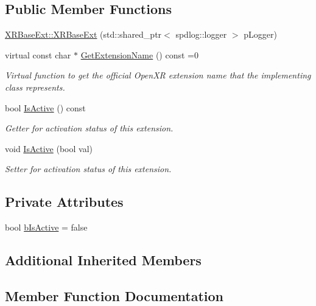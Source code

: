 \subsection*{Public Member Functions}
\begin{DoxyCompactItemize}
\item 
\mbox{\hyperlink{class_open_x_r_provider_1_1_x_r_base_ext_a8f59e68df5f1773152a3dfbe9ddc17fc}{X\+R\+Base\+Ext\+::\+X\+R\+Base\+Ext}} (std\+::shared\+\_\+ptr$<$ spdlog\+::logger $>$ p\+Logger)
\item 
virtual const char $\ast$ \mbox{\hyperlink{class_open_x_r_provider_1_1_x_r_base_ext_af23385b0dc226b0c4533a796ddc37352}{Get\+Extension\+Name}} () const =0
\begin{DoxyCompactList}\small\item\em Virtual function to get the official Open\+XR extension name that the implementing class represents. \end{DoxyCompactList}\item 
bool \mbox{\hyperlink{class_open_x_r_provider_1_1_x_r_base_ext_a40bce34f078349e639139ea85b630ac3}{Is\+Active}} () const
\begin{DoxyCompactList}\small\item\em Getter for activation status of this extension. \end{DoxyCompactList}\item 
void \mbox{\hyperlink{class_open_x_r_provider_1_1_x_r_base_ext_a19dd6d3922ebeb2f64402f2dcc23245b}{Is\+Active}} (bool val)
\begin{DoxyCompactList}\small\item\em Setter for activation status of this extension. \end{DoxyCompactList}\end{DoxyCompactItemize}
\subsection*{Private Attributes}
\begin{DoxyCompactItemize}
\item 
bool \mbox{\hyperlink{class_open_x_r_provider_1_1_x_r_base_ext_a7be8f3a5c24c3396c29cf37c4848b1b2}{b\+Is\+Active}} = false
\end{DoxyCompactItemize}
\subsection*{Additional Inherited Members}


\subsection{Member Function Documentation}
\mbox{\label{class_open_x_r_provider_1_1_x_r_base_ext_af23385b0dc226b0c4533a796ddc37352}} 
